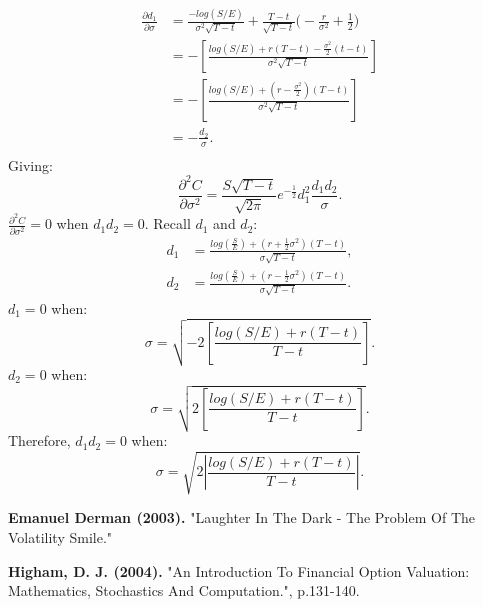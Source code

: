 \documentclass[a4paper]{article}
\begin{document}
\begin{align*}
	\frac{\partial d_1}{\partial \sigma} & = \frac{-log(S/E)}{\sigma^2 \sqrt{T-t}} + \frac{T-t}{\sqrt{T-t}}\big(-\frac{r}{\sigma^2} + \frac{1}{2} \big) \\
	& = -\left[ \frac{log(S/E) + r(T-t) - \frac{\sigma^2}{2}(t-t)}{\sigma^2\sqrt{T-t}} \right] \\
	& = - \left[ \frac{log(S/E) + (r-\frac{\sigma^2}{2})(T-t)}{\sigma^2\sqrt{T-t}} \right] \\
	& = -\frac{d_2}{\sigma}. \\
\end{align*}
Giving:
\[ \frac{\partial^2 C}{\partial \sigma^2} = \frac{S\sqrt{T-t}}{\sqrt{2\pi}}e^{-\frac{1}{2}}d_1^2\frac{d_1d_2}{\sigma}. \]
$\frac{\partial^2 C}{\partial \sigma^2}=0$ when $d_1d_2=0$. Recall $d_1$ and $d_2$:
\begin{align*}
	d_1 & = \frac{log(\frac{S}{E}) + (r + \frac{1}{2} \sigma^2)(T-t)}{\sigma \sqrt{T-t}}, \\
	d_2 & = \frac{log(\frac{S}{E}) + (r - \frac{1}{2} \sigma^2)(T-t)}{\sigma \sqrt{T-t}}.
\end{align*}
$d_1=0$ when:
\[ \sigma = \sqrt{-2 \left[ \frac{log(S/E) + r(T-t)}{T-t}\right]}. \] 
$d_2=0$ when:
\[ \sigma = \sqrt{2 \left[ \frac{log(S/E) + r(T-t)}{T-t}\right]}. \]
Therefore, $d_1d_2=0$ when:
\[ \sigma = \sqrt{2 \left| \frac{log(S/E) + r(T-t)}{T-t} \right| }. \]



\newpage



\begin{thebibliography}{99}

 \textbf{Emanuel Derman (2003).} "Laughter In The Dark - The Problem Of The Volatility Smile."

\textbf{Higham, D. J. (2004).} "An Introduction To Financial Option Valuation: Mathematics, Stochastics And Computation.", p.131-140.


\end{thebibliography}
























	
\end{document}
